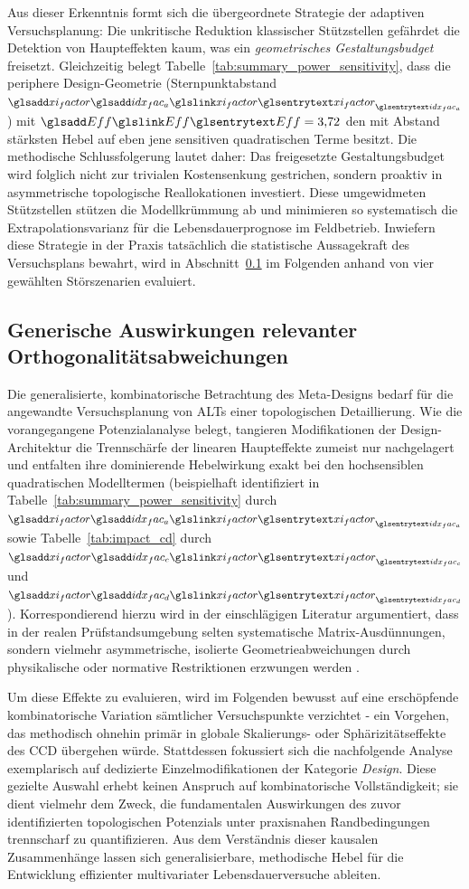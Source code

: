 Aus dieser Erkenntnis formt sich die übergeordnete Strategie der adaptiven Versuchsplanung:
Die unkritische Reduktion klassischer Stützstellen gefährdet die Detektion von Haupteffekten kaum, was ein \textit{geometrisches Gestaltungsbudget} freisetzt.
Gleichzeitig belegt Tabelle~\ref{tab:summary_power_sensitivity}, dass die periphere Design-Geometrie (Sternpunktabstand $\symsub{xi_factor}{idx_fac_a}$) mit $\sym{Eff}=3{,}72$ den mit Abstand stärksten Hebel auf eben jene sensitiven quadratischen Terme besitzt.
Die methodische Schlussfolgerung lautet daher: Das freigesetzte Gestaltungsbudget wird folglich nicht zur trivialen Kostensenkung gestrichen, sondern proaktiv in asymmetrische topologische Reallokationen investiert.
Diese umgewidmeten Stützstellen stützen die Modellkrümmung ab und minimieren so systematisch die Extrapolationsvarianz für die Lebensdauerprognose im Feldbetrieb.
Inwiefern diese Strategie in der Praxis tatsächlich die statistische Aussagekraft des Versuchsplans bewahrt, wird in Abschnitt~\ref{subsec:ergebnisse_generic} im Folgenden anhand von vier gewählten Störszenarien evaluiert.

\subsection{Generische Auswirkungen relevanter Orthogonalitätsabweichungen} \label{subsec:ergebnisse_generic}
Die generalisierte, kombinatorische Betrachtung des Meta-Designs bedarf für die angewandte Versuchsplanung von \acp{ALT} einer topologischen Detaillierung.
Wie die vorangegangene Potenzialanalyse belegt, tangieren Modifikationen der Design-Architektur die Trennschärfe der linearen Haupteffekte zumeist nur nachgelagert und entfalten ihre dominierende Hebelwirkung exakt bei den hochsensiblen quadratischen Modelltermen (beispielhaft identifiziert in Tabelle~\ref{tab:summary_power_sensitivity} durch $\symsub{xi_factor}{idx_fac_a}$ sowie Tabelle~\ref{tab:impact_cd} durch $\symsub{xi_factor}{idx_fac_c}$ und $\symsub{xi_factor}{idx_fac_d}$).
Korrespondierend hierzu wird in der einschlägigen Literatur argumentiert, dass in der realen Prüfstandsumgebung selten systematische Matrix-Ausdünnungen, sondern vielmehr asymmetrische, isolierte Geometrieabweichungen durch physikalische oder normative Restriktionen erzwungen werden \cite{Arndt.2022,Mell.2022,Box.1963,Ahn.2015}.

Um diese Effekte zu evaluieren, wird im Folgenden bewusst auf eine erschöpfende kombinatorische Variation sämtlicher Versuchspunkte verzichtet - ein Vorgehen, das methodisch ohnehin primär in globale Skalierungs- oder Sphärizitätseffekte des \ac{CCD} übergehen würde.
Stattdessen fokussiert sich die nachfolgende Analyse exemplarisch auf dedizierte Einzelmodifikationen der Kategorie \textit{Design}.
Diese gezielte Auswahl erhebt keinen Anspruch auf kombinatorische Vollständigkeit; sie dient vielmehr dem Zweck, die fundamentalen Auswirkungen des zuvor identifizierten topologischen Potenzials unter praxisnahen Randbedingungen trennscharf zu quantifizieren.
Aus dem Verständnis dieser kausalen Zusammenhänge lassen sich generalisierbare, methodische Hebel für die Entwicklung effizienter multivariater Lebensdauerversuche ableiten.

